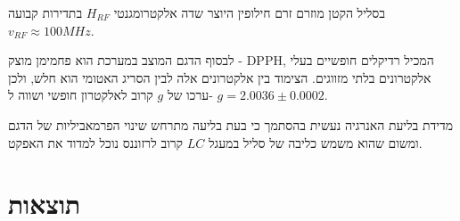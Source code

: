 \documentclass{article}
\begin{document}
בסליל הקטן מוזרם זרם חילופין היוצר שדה אלקטרומגנטי 
$H_{RF}$
בתדירות קבועה
$v_{RF} \approx 100 MHz$.

לבסוף הדגם המוצב במערכת הוא פחמימן מוצק -
\textenglish{DPPH},
המכיל רדיקלים חופשיים בעלי אלקטרונים בלתי מזווגים.
הצימוד בין אלקטרונים אלה לבין הסריג האטומי הוא חלש, ולכן ערכו של
$g$
קרוב לאלקטרון חופשי ושווה ל-
$g = 2.0036 \pm 0.0002$.


מדידת בליעת האנרגיה נעשית בהסתמך כי בעת בליעה מתרחש שינוי הפרמאביליות של הדגם ומשום שהוא משמש כליבה של סליל במעגל
$LC$
קרוב לרזוננס נוכל למדוד את האפקט.
\section{תוצאות}



\end{document}
